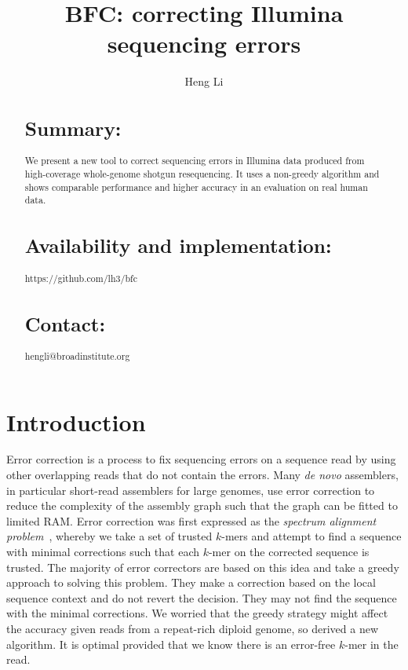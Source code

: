 \documentclass{bioinfo}
\begin{document}

\title[Error Correction for Illumina Data]{BFC: correcting Illumina sequencing errors}

\author[Li]{Heng Li}

\address{Broad Institute, 75 Ames Street, Cambridge, MA 02142, USA}

\maketitle

\begin{abstract}
\section{Summary:} We present a new tool to correct sequencing errors in
Illumina data produced from high-coverage whole-genome shotgun resequencing. It
uses a non-greedy algorithm and shows comparable performance and higher
accuracy in an evaluation on real human data.

\section{Availability and implementation:} https://github.com/lh3/bfc

\section{Contact:} hengli@broadinstitute.org
\end{abstract}

\section{Introduction}

Error correction is a process to fix sequencing errors on a sequence read
by using other overlapping reads that do not contain the errors. Many \emph{de
novo} assemblers, in particular short-read assemblers for large genomes, use
error correction to reduce the complexity of the assembly graph such that the
graph can be fitted to limited RAM. Error correction was first expressed
as the \emph{spectrum alignment problem}~\citep{Pevzner:2001vn}, whereby we take
a set of trusted $k$-mers and attempt to find a sequence with minimal
corrections such that each $k$-mer on the corrected sequence is trusted.
The majority of error correctors are based on this idea and take a greedy
approach to solving this problem.  They make a correction based on the local
sequence context and do not revert the decision. They may not find the sequence
with the minimal corrections. We worried that the greedy strategy might affect
the accuracy given reads from a repeat-rich diploid genome, so derived a new
algorithm. It is optimal provided that we know there is an error-free $k$-mer
in the read.
\end{document}
